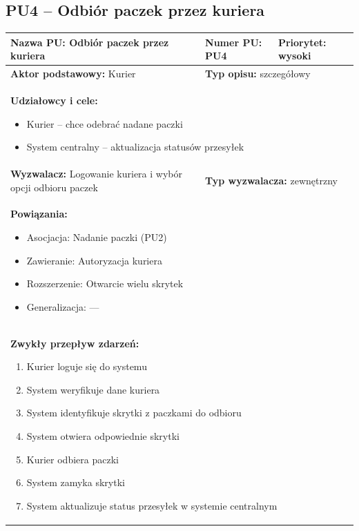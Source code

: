 \documentclass[a4paper,12pt]{article}
\begin{document}
\vspace{1cm}

\subsection{PU4 – Odbiór paczek przez kuriera}

\begin{tabular}{|p{6cm}|p{4cm}|p{5cm}|}
\hline
\textbf{Nazwa PU:} Odbiór paczek przez kuriera &
\textbf{Numer PU:} PU4 &
\textbf{Priorytet:} wysoki \\
\hline
\textbf{Aktor podstawowy:} Kurier &
\multicolumn{2}{p{9cm}|}{\textbf{Typ opisu:} szczegółowy} \\
\hline
\multicolumn{3}{|p{15cm}|}{
\textbf{Udziałowcy i cele:}
\begin{itemize}
\item Kurier – chce odebrać nadane paczki
\item System centralny – aktualizacja statusów przesyłek
\end{itemize}
} \\
\hline
\textbf{Wyzwalacz:} Logowanie kuriera i wybór opcji odbioru paczek &
\multicolumn{2}{p{9cm}|}{\textbf{Typ wyzwalacza:} zewnętrzny} \\
\hline
\multicolumn{3}{|p{15cm}|}{
\textbf{Powiązania:}
\begin{itemize}
\item Asocjacja: Nadanie paczki (PU2)
\item Zawieranie: Autoryzacja kuriera
\item Rozszerzenie: Otwarcie wielu skrytek
\item Generalizacja: —
\end{itemize}
} \\
\hline
\multicolumn{3}{|p{15cm}|}{
\textbf{Zwykły przepływ zdarzeń:}
\begin{enumerate}
\item Kurier loguje się do systemu
\item System weryfikuje dane kuriera
\item System identyfikuje skrytki z paczkami do odbioru
\item System otwiera odpowiednie skrytki
\item Kurier odbiera paczki
\item System zamyka skrytki
\item System aktualizuje status przesyłek w systemie centralnym
\end{enumerate}
}
\end{tabular}
\end{document}
